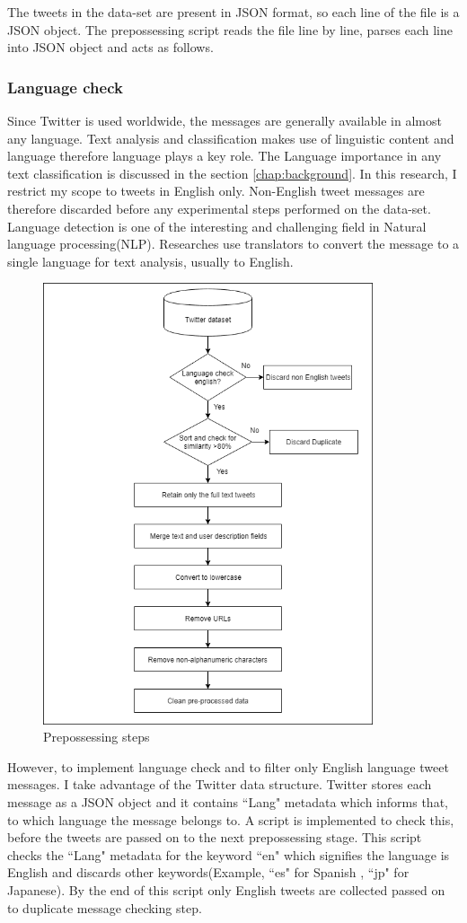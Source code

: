 The tweets in the data-set are present in JSON format, so each line of the file is a JSON object. The prepossessing script reads the file line by line, parses each line into JSON object and acts as follows.

\subsubsection{Language check}
Since Twitter is used worldwide, the messages are generally available in almost any language. Text analysis and classification makes use of linguistic content and language therefore language plays a key role. The Language importance in any text classification is discussed in the section \ref{chap:background}. In this research, I restrict my scope to tweets in English only. Non-English tweet messages are therefore discarded before any experimental steps performed on the data-set. 
Language detection is one of the interesting and challenging field in Natural language processing(NLP). Researches use translators to convert the message to a single language for text analysis, usually to English.
\begin{figure}
	\centering
	\includegraphics[width=10cm\linewidth,height=13cm]{thesis_template/images/preprocessing.png}
	\caption{Prepossessing steps}
	\label{fig:preprocessing}
\end{figure}
However, to implement language check and to filter only English language tweet messages. I take advantage of the Twitter data structure. Twitter stores each message as a JSON object and it contains ``Lang" metadata which  informs that, to which language the message belongs to. A script is implemented to check this, before the tweets are passed on to the next prepossessing stage. This script checks the ``Lang" metadata for the keyword ``en" which signifies the language is English and discards other keywords(Example, ``es" for Spanish , ``jp" for Japanese). By the end of this script only English tweets are collected passed on to duplicate message checking step.  

